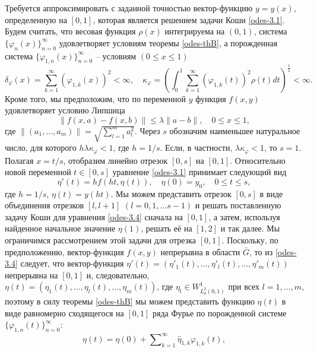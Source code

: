 Требуется аппроксимировать с заданной точностью вектор-функцию $y=y(x)$, определенную на $[0,1]$, которая является решением задачи Коши \eqref{odes-3.1}.
Будем считать, что весовая функция $\rho(x)$ интегрируема на $(0,1)$, система $\{\varphi_{n}(x)\}_{n=0}^\infty$ удовлетворяет условиям теоремы \ref{odes-thB}, а порожденная система $\{\varphi_{1,n}(x)\}_{n=0}^\infty$ -- условиям $(0\le x\le 1)$
\begin{equation}\label{odes-3.2}
\delta_\varphi(x)=\sum_{k=1}^{\infty}(\varphi_{1,k}(x))^2<\infty,\quad
\kappa_{\varphi}=\left(\int_0^1\sum_{k=1}^{\infty}
(\varphi_{1,k}(t))^2\rho(t)dt\right)^{\frac12}<\infty.
\end{equation}
Кроме того, мы предположим, что по переменной $y$ функция $f(x,y)$ удовлетворяет условию Липшица
 \begin{equation}\label{odes-3.3}
\|f(x,a)-f(x,b)\|\le \lambda\|a-b\|, \quad 0\le x \le 1,
\end{equation}
где $\|(a_1,\ldots,a_m)\|=\sqrt{\sum_{l=1}^ma_l^2}$. Через $s$ обозначим наименьшее натуральное число, для которого $h\lambda\kappa_\varphi<1$, где $h=1/s$. Если, в частности, $\lambda\kappa_\varphi<1$, то $s=1$. Полагая $x=t/s$, отобразим линейно отрезок $[0,s]$ на $[0,1]$. Относительно новой переменной $t\in [0,s]$ уравнение \eqref{odes-3.1} принимает следующий вид
\begin{equation}\label{odes-3.4}
\eta'(t)=hf(ht,\eta(t)), \quad \eta(0)=y_0,\quad 0\le t\le s,
\end{equation}
где $h=1/s$, $\eta(t)=y(ht)$. Мы можем представить отрезок $[0,s]$ в виде объединения отрезков $[l,l+1]$ $(l=0,1,\ldots s-1)$ и  решать поставленную задачу Коши для уравнения \eqref{odes-3.4} сначала на $[0,1]$, а затем, используя найденное начальное значение $\eta(1)$,  решать её на $[1,2]$ и так далее. Мы ограничимся рассмотрением этой задачи для отрезка $[0,1]$. Поскольку, по предположению, вектор-функция $f(x,y)$ непрерывна в области $\bar G$, то из \eqref{odes-3.4} следует, что  вектор-функция $\eta'(t)=(\eta'_1(t),\ldots,\eta'_l(t),\ldots,\eta'_m(t))$ непрерывна на $[0,1]$ и, следовательно, $\eta(t)=(\eta_1(t),\ldots,\eta_l(t),\ldots,\eta_m(t))$, где $\eta_l\in W_{L_\rho^2(0,1)}^1$ при всех $l=1,\ldots,m$, поэтому в силу теоремы \ref{odes-thB}  мы можем представить  функцию $\eta(t)$ в виде равномерно сходящегося на $[0,1]$ ряда Фурье по порожденной системе $\{\varphi_{1,n}(t)\}_{n=0}^\infty$:
\begin{equation}\label{odes-3.5}
\eta(t)= \eta(0)+ \sum\nolimits_{k=1}^\infty \hat \eta_{1,k}\varphi_{1,k}(t),
\end{equation}
